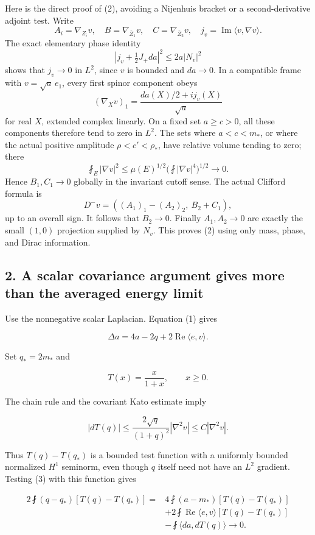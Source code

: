 \documentclass[11pt]{article}
\begin{document}
Here is the direct proof of (2), avoiding a Nijenhuis bracket or a
second-derivative adjoint test. Write \[
 A_i=\nabla_{Z_i}v,\quad B=\nabla_{\bar Z_1}v,
 \quad C=\nabla_{\bar Z_2}v,\quad
 j_v=\operatorname{Im}\langle v,\nabla v\rangle.
\] The exact elementary phase identity \[
 |j_v+\tfrac12J_+da|^2\le2a|N_v|^2
\] shows that \(j_v\to0\) in \(L^2\), since \(v\) is bounded and
\(da\to0\). In a compatible frame with \(v=\sqrt a\,e_1\), every first
spinor component obeys \[
 (\nabla_Xv)_1=\frac{da(X)/2+i j_v(X)}{\sqrt a}
\] for real \(X\), extended complex linearly. On a fixed set
\(a\ge c>0\), all these components therefore tend to zero in \(L^2\).
The sets where \(a<c<m_*\), or where the actual positive amplitude
\(\rho<c'<\rho_*\), have relative volume tending to zero; there \[
 \fint_E|\nabla v|^2
 \le \mu(E)^{1/2}\bigl(\fint|\nabla v|^4\bigr)^{1/2}\to0.
\] Hence \(B_1,C_1\to0\) globally in the invariant cutoff sense. The
actual Clifford formula is \[
 D^-v=((A_1)_1-(A_2)_2,\ B_2+C_1),
\] up to an overall sign. It follows that \(B_2\to0\). Finally
\(A_1,A_2\to0\) are exactly the small \((1,0)\) projection supplied by
\(N_v\). This proves (2) using only mass, phase, and Dirac information.

\hypertarget{a-scalar-covariance-argument-gives-more-than-the-averaged-energy-limit}{%
\subsection{2. A scalar covariance argument gives more than the averaged
energy
limit}\label{a-scalar-covariance-argument-gives-more-than-the-averaged-energy-limit}}

Use the nonnegative scalar Laplacian. Equation (1) gives

\[
 \Delta a=4a-2q+2\operatorname{Re}\langle e,v\rangle.
\tag{C.3}
\]

Set \(q_*=2m_*\) and

\[
 T(x)=\frac{x}{1+x},\qquad x\ge0.
\]

The chain rule and the covariant Kato estimate imply

\[
 |dT(q)|\le \frac{2\sqrt q}{(1+q)^2}|\nabla^2v|
 \le C|\nabla^2v|.
\tag{C.4}
\]

Thus \(T(q)-T(q_*)\) is a bounded test function with a uniformly bounded
normalized \(H^1\) seminorm, even though \(q\) itself need not have an
\(L^2\) gradient. Testing (3) with this function gives

\[
\begin{aligned}
 2\fint(q-q_*)[T(q)-T(q_*)]
 ={}&4\fint(a-m_*)[T(q)-T(q_*)]\\
 &+2\fint\operatorname{Re}\langle e,v\rangle[T(q)-T(q_*)]\\
 &-\fint\langle da,dT(q)\rangle\longrightarrow0.
\end{aligned}
\tag{C.5}
\]
\end{document}

